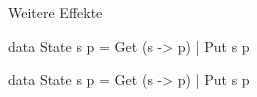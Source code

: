 \documentclass{beamer}
\begin{document}
\begin{frame}[fragile]{Weitere Effekte}
\begin{haskellcode}
data State s p = Get (s -> p)
               | Put s p

\end{haskellcode}
\begin{haskellcode}
data State s p = Get (s -> p)
               | Put s p

\end{haskellcode}
\end{frame}
\end{document}
